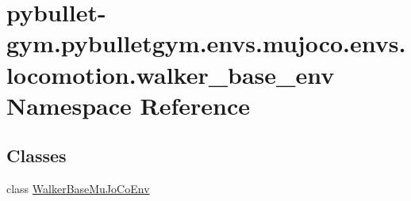 \hypertarget{namespacepybullet-gym_1_1pybulletgym_1_1envs_1_1mujoco_1_1envs_1_1locomotion_1_1walker__base__env}{}\section{pybullet-\/gym.pybulletgym.\+envs.\+mujoco.\+envs.\+locomotion.\+walker\+\_\+base\+\_\+env Namespace Reference}
\label{namespacepybullet-gym_1_1pybulletgym_1_1envs_1_1mujoco_1_1envs_1_1locomotion_1_1walker__base__env}
\subsection*{Classes}
\begin{DoxyCompactItemize}
\item 
class \hyperlink{classpybullet-gym_1_1pybulletgym_1_1envs_1_1mujoco_1_1envs_1_1locomotion_1_1walker__base__env_1_1_walker_base_mu_jo_co_env}{Walker\+Base\+Mu\+Jo\+Co\+Env}
\end{DoxyCompactItemize}
